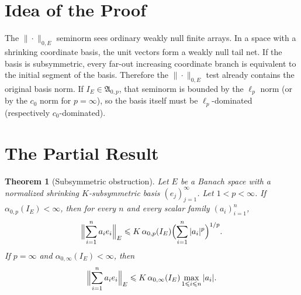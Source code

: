 \documentclass[11pt]{article}
\newtheorem{theorem}{Theorem}
\begin{document}
\section*{Idea of the Proof}

The $\|\cdot\|_{0,E}$ seminorm sees ordinary weakly null finite arrays.  In a
space with a shrinking coordinate basis, the unit vectors form a weakly null
tail net.  If the basis is subsymmetric, every far-out increasing coordinate
branch is equivalent to the initial segment of the basis.  Therefore the
$\|\cdot\|_{0,E}$ test already contains the original basis norm.  If
$I_E\in\mathfrak{A}_{0,p}$, that seminorm is bounded by the $\ell_p$ norm
(or by the $c_0$ norm for $p=\infty$), so the basis itself must be
$\ell_p$-dominated (respectively $c_0$-dominated).

\section*{The Partial Result}

\begin{theorem}[Subsymmetric obstruction]
Let $E$ be a Banach space with a normalized shrinking $K$-subsymmetric basis
$(e_j)_{j=1}^\infty$.  Let $1<p<\infty$.  If
$\alpha_{0,p}(I_E)<\infty$, then for every $n$ and every scalar family
$(a_i)_{i=1}^n$,
\[
  \Bigl\|\sum_{i=1}^n a_i e_i\Bigr\|_E
  \leqslant K\,\alpha_{0,p}(I_E)
  \Bigl(\sum_{i=1}^n |a_i|^p\Bigr)^{1/p}.
\]
If $p=\infty$ and $\alpha_{0,\infty}(I_E)<\infty$, then
\[
  \Bigl\|\sum_{i=1}^n a_i e_i\Bigr\|_E
  \leqslant K\,\alpha_{0,\infty}(I_E)\max_{1\leqslant i\leqslant n}|a_i|.
\]
\end{theorem}
\end{document}
